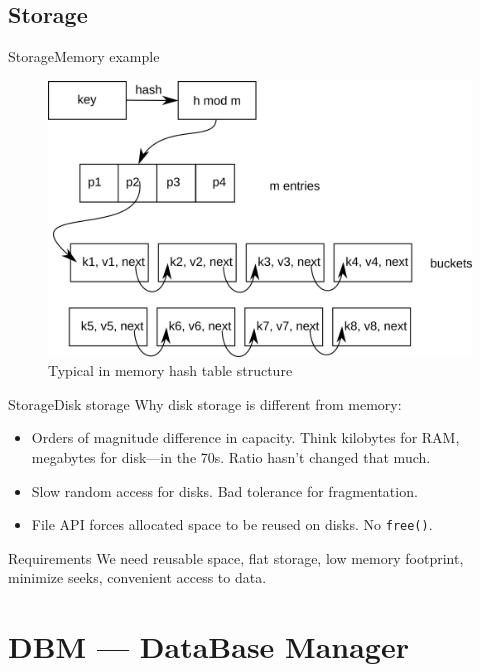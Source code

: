 \documentclass{beamer}
\begin{document}
\subsection{Storage}

\begin{frame}{Storage}{Memory example}

\begin{figure}
\includegraphics[scale=0.8]{hash_table.png}
\caption{Typical in memory hash table structure}
\end{figure}
\end{frame}


\begin{frame}{Storage}{Disk storage}
Why disk storage is different from memory:
\begin{itemize}
\item Orders of magnitude difference in capacity. Think kilobytes for RAM,
megabytes for disk---in the 70s. Ratio hasn't changed that much.
\item Slow random access for disks. Bad tolerance for fragmentation.
\item File API forces allocated space to be reused on disks. No
\texttt{free()}.
\end{itemize}

\begin{block}{Requirements}
We need reusable space, flat storage, low memory footprint, minimize seeks, convenient
access to data.
\end{block}
\end{frame}

\section{DBM --- DataBase Manager}
\end{document}
